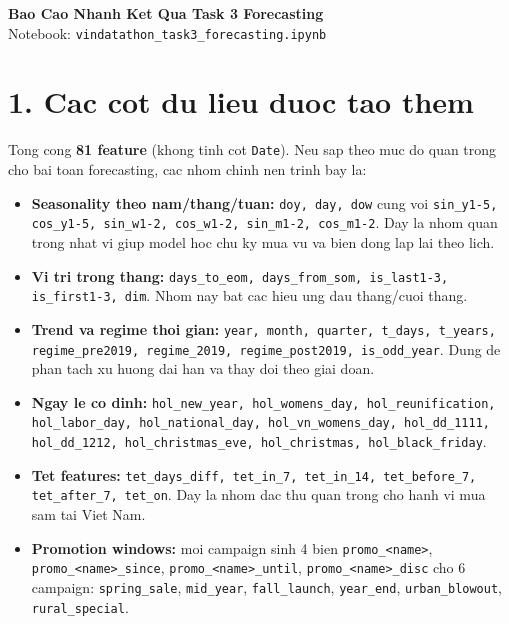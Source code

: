 \documentclass[10pt,a4paper]{article}
\begin{document}
\small

\begin{center}
{\Large \textbf{Bao Cao Nhanh Ket Qua Task 3 Forecasting}}\\
\vspace{2pt}
\normalsize Notebook: \texttt{vindatathon\_task3\_forecasting.ipynb}
\end{center}

\section*{1. Cac cot du lieu duoc tao them}
Tong cong \textbf{81 feature} (khong tinh cot \texttt{Date}). Neu sap theo muc do quan trong cho bai toan forecasting, cac nhom chinh nen trinh bay la:
\begin{itemize}[leftmargin=14pt,itemsep=1pt,topsep=2pt]
\item \textbf{Seasonality theo nam/thang/tuan:} \texttt{doy, day, dow} cung voi \texttt{sin\_y1-5, cos\_y1-5, sin\_w1-2, cos\_w1-2, sin\_m1-2, cos\_m1-2}. Day la nhom quan trong nhat vi giup model hoc chu ky mua vu va bien dong lap lai theo lich.
\item \textbf{Vi tri trong thang:} \texttt{days\_to\_eom, days\_from\_som, is\_last1-3, is\_first1-3, dim}. Nhom nay bat cac hieu ung dau thang/cuoi thang.
\item \textbf{Trend va regime thoi gian:} \texttt{year, month, quarter, t\_days, t\_years, regime\_pre2019, regime\_2019, regime\_post2019, is\_odd\_year}. Dung de phan tach xu huong dai han va thay doi theo giai doan.
\item \textbf{Ngay le co dinh:} \texttt{hol\_new\_year, hol\_womens\_day, hol\_reunification, hol\_labor\_day, hol\_national\_day, hol\_vn\_womens\_day, hol\_dd\_1111, hol\_dd\_1212, hol\_christmas\_eve, hol\_christmas, hol\_black\_friday}.
\item \textbf{Tet features:} \texttt{tet\_days\_diff, tet\_in\_7, tet\_in\_14, tet\_before\_7, tet\_after\_7, tet\_on}. Day la nhom dac thu quan trong cho hanh vi mua sam tai Viet Nam.
\item \textbf{Promotion windows:} moi campaign sinh 4 bien \texttt{promo\_<name>}, \texttt{promo\_<name>\_since}, \texttt{promo\_<name>\_until}, \texttt{promo\_<name>\_disc} cho 6 campaign: \texttt{spring\_sale}, \texttt{mid\_year}, \texttt{fall\_launch}, \texttt{year\_end}, \texttt{urban\_blowout}, \texttt{rural\_special}.
\end{itemize}
\end{document}
